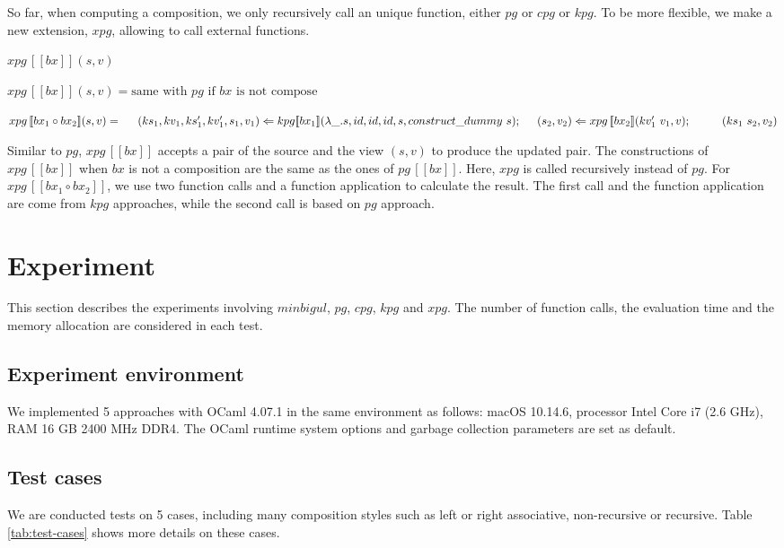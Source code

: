 \documentclass[runningheads]{llncs}
\newcommand{\tab}{\hspace*{5mm}}
\newcommand{\qtab}{\hspace*{5mm} \ \quad}
\newcommand{\pginline}[1]{pg \, [\![#1]\!]}
\newcommand{\kpg}[7]{kpg [\![#1]\!] (#2, #3, #4, #5, #6, #7)}
\newcommand{\xpg}[3]{xpg \, [\![#1]\!] (#2, #3)}
\newcommand{\xpginline}[1]{xpg \, [\![#1]\!]}
\begin{document}
So far, when computing a composition, we only recursively call an unique function, either $pg$ or $cpg$ or $kpg$. To be more flexible, we make a new extension, $xpg$, allowing to call external functions.

\begin{definition}
$\xpg{bx}{s}{v}$

$\xpg{bx}{s}{v} = \text{same with } pg \text{ if } bx \text{ is not compose}$

$\xpg{bx_1 \circ bx_2}{s}{v} =\\
    \tab (ks_1,kv_1, ks_1', kv_1', s_1, v_1) \Leftarrow \kpg{bx_1}{\lambda \_.s}{id}{id}{id}{s}{construct\_dummy \ s};\\
    \tab (s_2, v_2) \Leftarrow \xpg{bx_2}{kv_1' \ v_1}{v};\\
    \qtab (ks_1 \ s_2, v_2)$
\end{definition}

Similar to $pg$, $\xpginline{bx}$ accepts a pair of the source and the view $(s,v)$ to produce the updated pair. The constructions of $\xpginline{bx}$ when $bx$ is not a composition are the same as the ones of $\pginline{bx}$. Here, $xpg$ is called recursively instead of $pg$. For $\xpginline{bx_1 \circ bx_2}$, we use two function calls and a function application to calculate the result. The first call and the function application are come from $kpg$ approaches, while the second call is based on $pg$ approach.

\section{Experiment}

This section describes the experiments involving $minbigul$, $pg$, $cpg$, $kpg$ and $xpg$. The number of function calls, the evaluation time and the memory allocation are considered in each test.

\subsection{Experiment environment}
We implemented 5 approaches with OCaml 4.07.1 in the same environment as follows: macOS 10.14.6, processor Intel Core i7 (2.6 GHz), RAM 16 GB 2400 MHz DDR4. The OCaml runtime system options and garbage collection parameters are set as default.  

\subsection{Test cases}
We are conducted tests on 5 cases, including many composition styles such as left or right associative, non-recursive or recursive. Table \ref{tab:test-cases} shows more details on these cases.
\end{document}
